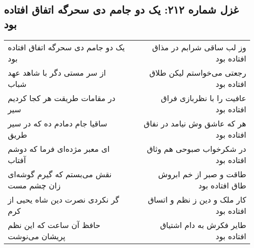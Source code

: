 \begin{center}
\section*{غزل شماره ۲۱۲: یک دو جامم دی سحرگه اتفاق افتاده بود}
\label{sec:sh212}
\begin{longtable}{l p{0.5cm} r}
یک دو جامم دی سحرگه اتفاق افتاده بود
&&
وز لب ساقی شرابم در مذاق افتاده بود
\\
از سر مستی دگر با شاهد عهد شباب
&&
رجعتی می‌خواستم لیکن طلاق افتاده بود
\\
در مقامات طریقت هر کجا کردیم سیر
&&
عافیت را با نظربازی فراق افتاده بود
\\
ساقیا جام دمادم ده که در سیر طریق
&&
هر که عاشق وش نیامد در نفاق افتاده بود
\\
ای معبر مژده‌ای فرما که دوشم آفتاب
&&
در شکرخواب صبوحی هم وثاق افتاده بود
\\
نقش می‌بستم که گیرم گوشه‌ای زان چشم مست
&&
طاقت و صبر از خم ابروش طاق افتاده بود
\\
گر نکردی نصرت دین شاه یحیی از کرم
&&
کار ملک و دین ز نظم و اتساق افتاده بود
\\
حافظ آن ساعت که این نظم پریشان می‌نوشت
&&
طایر فکرش به دام اشتیاق افتاده بود
\\
\end{longtable}
\end{center}
